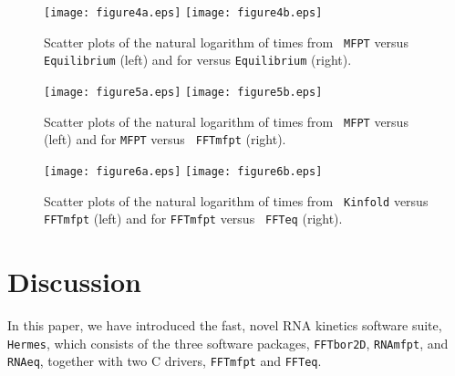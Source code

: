 \begin{figure}
\centering
\texttt{[image: figure4a.eps]}
\texttt{[image: figure4b.eps]}
\caption{ Scatter plots of the natural logarithm of times from {\tt
MFPT} versus {\tt Equilibrium} (left) and for \kinfold versus
{\tt Equilibrium} (right). }
\label{fig:scatterplot_single_bp_moves_for_kinfold_vs_rnaeq}
\end{figure}


\begin{figure}
\centering
\texttt{[image: figure5a.eps]}
\texttt{[image: figure5b.eps]}
\caption{ Scatter plots of the natural logarithm of times from {\tt
MFPT} versus \kinfold (left) and for {\tt MFPT} versus {\tt
FFTmfpt} (right). }
\label{fig:scatterplot_single_bp_moves_for_actual_mfpt_vs_fftbor2d}
\end{figure}


\begin{figure}
\centering
\texttt{[image: figure6a.eps]}
\texttt{[image: figure6b.eps]}
\caption{ Scatter plots of the natural logarithm of times from {\tt
Kinfold} versus {\tt FFTmfpt} (left) and for {\tt FFTmfpt} versus {\tt
FFTeq} (right). }
\label{fig:scatterplot_single_bp_moves_for_fftbor2d_vs_rnapopulation}
\end{figure}



\section{Discussion}
\label{section:discussion}

In this paper, we have introduced
the fast, novel RNA kinetics software suite, {\tt
Hermes}, which consists of the three software packages, {\tt FFTbor2D},
{\tt RNAmfpt}, and {\tt RNAeq},  together with two C drivers,
{\tt FFTmfpt} and {\tt FFTeq}.

